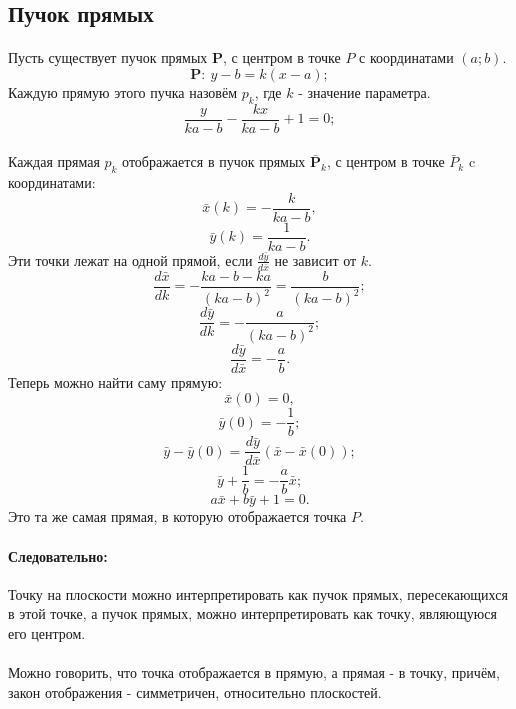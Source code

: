 \subsection{Пучок прямых}
\paragraph{}Пусть существует пучок прямых $\mathbf{P}$, с центром в точке $P$ с координатами $(a; b)$.
$$\mathbf{P}:\: y-b = k(x - a);$$
Каждую прямую этого пучка назовём $p_k$, где $k$ - значение параметра.
$$\frac{y}{ka-b} - \frac{kx}{ka-b} + 1 = 0;$$
\paragraph{}Каждая прямая $p_k$ отображается в пучок прямых $\mathbf{\bar{P}}_k$, с центром в точке $\bar{P}_k$ c координатами:
$$\bar{x}(k) = -\frac{k}{ka-b},$$
$$\bar{y}(k) = \frac{1}{ka-b}.$$
Эти точки лежат на одной прямой, если $\frac{d\bar{y}}{d\bar{x}}$ не зависит от $k$.
$$\frac{d\bar{x}}{dk} = - \frac{ka-b-ka}{\left(ka-b\right)^2} =  \frac{b}{\left(ka-b\right)^2};$$
$$\frac{d\bar{y}}{dk} = - \frac{a}{\left(ka-b\right)^2};$$
$$\frac{d\bar{y}}{d\bar{x}} = -\frac{a}{b}.$$
Теперь можно найти саму прямую:
$$\bar{x}(0) = 0,$$
$$\bar{y}(0) = -\frac{1}{b};$$
$$\bar{y} - \bar{y}(0) = \frac{d\bar{y}}{d\bar{x}}\left(\bar{x} - \bar{x}(0)\right);$$
$$\bar{y} + \frac{1}{b} = -\frac{a}{b}\bar{x};$$
$$a\bar{x} + b\bar{y} + 1 = 0.$$
Это та же самая прямая, в которую отображается точка $P$.
\paragraph{Следовательно:} Точку на плоскости можно интерпретировать как пучок прямых, пересекающихся в этой точке, а пучок прямых, можно интерпретировать как точку, являющуюся его центром.
\paragraph{} Можно говорить, что точка отображается в прямую, а прямая - в точку, причём, закон отображения - симметричен, относительно плоскостей.